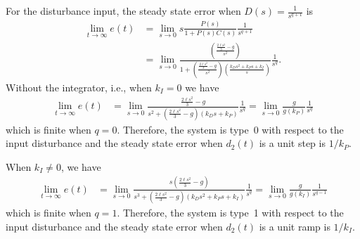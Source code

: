 For the disturbance input, the steady state error when $D(s) = \frac{1}{s^{q+1}}$ is
\begin{align*}
\lim_{t\to\infty}e(t) &= \lim_{s\to 0}s\frac{P(s)}{1+P(s)C(s)}\frac{1}{s^{q+1}} \\
&= \lim_{s\to 0} \frac{\left(\frac{\frac{2\ell s^2}{3}-g}{s^2}\right)}{1+\left(\frac{\frac{2\ell s^2}{3}-g}{s^2}\right)\left(\frac{k_Ds^2+k_Ps+k_I}{s}\right)}\frac{1}{s^q}.
\end{align*}
Without the integrator, i.e., when $k_I=0$ we have
\begin{align*}
\lim_{t\to\infty}e(t) &= \lim_{s\to 0} \frac{\frac{2\ell s^2}{3}-g}{s^2+\left(\frac{2\ell s^2}{3}-g\right)\left(k_Ds+k_P\right)}\frac{1}{s^q} 
= \lim_{s\to 0} \frac{g}{g\left(k_P\right)}\frac{1}{s^q}
\end{align*}
which is finite when $q=0$.  Therefore, the system is type~0 with respect to the input disturbance and the steady state error when $d_2(t)$ is a unit step is $1/k_P$.  

When $k_I\neq 0$, we have
\begin{align*}
\lim_{t\to\infty}e(t) &= \lim_{s\to 0} \frac{s(\frac{2\ell s^2}{3}-g)}{s^3+\left(\frac{2\ell s^2}{3}-g \right)\left(k_Ds^2+k_Ps+k_I\right)}\frac{1}{s^q} 
= \lim_{s\to 0} \frac{g}{g\left(k_I\right)}\frac{1}{s^{q-1}}
\end{align*}
which is finite when $q=1$.  Therefore, the system is type~1 with respect to the input disturbance and the steady state error when $d_2(t)$ is a unit ramp is $1/k_I$.  

